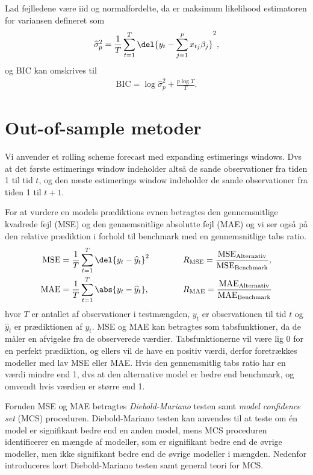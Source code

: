 Lad fejlledene være iid og normalfordelte, da er maksimum likelihood estimatoren for variansen defineret som
\begin{align*}
\widehat{\sigma}_p^2 = \frac{1}{T} \sum_{t=1}^{T} \del{y_t - \sum_{j=1}^p x_{tj}\beta_j}^2,
\end{align*}
og BIC kan omskrives til
\begin{align*}
\text{BIC} = \log \widehat{\sigma}^2_p + \frac{p \log T}{T}.
\end{align*}

\section{Out-of-sample metoder}
Vi anvender et rolling scheme forecast med expanding estimerings windows. 
Dvs at det første estimerings window indeholder altså de sande observationer fra tiden 1 til tid $t$, og den næste estimerings window indeholder de sande observationer fra tiden 1 til $t+1$.

For at vurdere en models prædiktions evnen betragtes den gennemsnitlige kvadrede fejl (MSE) og den gennemsnitlige absolutte fejl (MAE) og vi ser også på den relative prædiktion i forhold til benchmark med en gennemsnitlige tabs ratio.
\begin{align}
\text{MSE} & =  \frac{1}{T} \sum_{t=1}^{T} \del{y_{t} - \widehat{y}_{t}}^2 \label{eq:mse}  \qquad \qquad R_{\text{\text{MSE}}} = \frac{\text{MSE}_{\text{Alternativ}}}{\text{MSE}_{\text{Benchmark}}}, \\
\text{MAE} & =  \frac{1}{T} \sum_{t=1}^{T} \abs{y_{t} - \widehat{y}_{t}}, \label{eq:mae}  \qquad \qquad R_{\text{MAE}} = \frac{\text{MAE}_{\text{Alternativ}}}{\text{MAE}_{\text{Benchmark}}}
\end{align} 
hvor $T$ er antallet af observationer i testmængden, $y_{t}$ er observationen til tid $t$ og $\widehat{y}_{t}$ er prædiktionen af $y_{t}$.
MSE og MAE kan betragtes som tabsfunktioner, da de måler en afvigelse fra de observerede værdier.
Tabsfunktionerne vil være lig 0 for en perfekt prædiktion, og ellers vil de have en positiv værdi, derfor foretrækkes modeller med lav MSE eller MAE.
Hvis den gennemsnitlig tabs ratio har en værdi mindre end 1, dvs at den alternative model er bedre end benchmark, og omvendt hvis værdien er større end 1. 

Foruden MSE og MAE betragtes \textit{Diebold-Mariano} testen samt \textit{model confidence set} (MCS) proceduren.
Diebold-Mariano testen kan anvendes til at teste om én model er signifikant bedre end en anden model, mens MCS proceduren identificerer en mængde af modeller, som er signifikant bedre end de øvrige modeller, men ikke signifikant bedre end de øvrige modeller i mængden.
Nedenfor introduceres kort Diebold-Mariano testen samt general teori for MCS.




